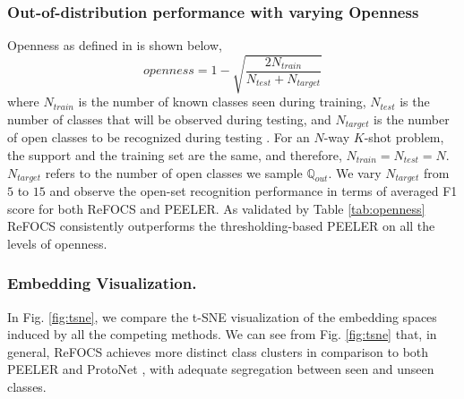 

\subsubsection*{Out-of-distribution performance with varying Openness}
Openness as defined in \cite{sun2020conditional} is shown below,
\begin{equation}
    openness = 1 - \sqrt{\frac{2N_{train}}{N_{test} + N_{target}}}
\end{equation}
where $N_{train}$ is the number of known classes seen during training, $N_{test}$ is the number of classes that will be observed during testing, and $N_{target}$ is the number of open classes to be recognized during testing \cite{sun2020conditional}. For an $N$-way $K$-shot problem, the support and the training set are the same, and therefore, $N_{train} = N_{test} = N$. $N_{target}$ refers to the number of open classes we sample $\mathbb{Q}_{out}$. We vary $N_{target}$ from $5$ to $15$ and observe the open-set recognition performance in terms of averaged F1 score \cite{sun2020conditional} for both ReFOCS and PEELER. As validated by Table \ref{tab:openness} ReFOCS consistently outperforms the thresholding-based PEELER on all the levels of openness.

\subsubsection*{Embedding Visualization.} In Fig. \ref{fig:tsne}, we compare the t-SNE \cite{tsne} visualization of the embedding spaces induced by all the competing methods. We can see from Fig. \ref{fig:tsne} that, in general, ReFOCS achieves more distinct class clusters in comparison to both PEELER \cite{peeler} and ProtoNet \cite{proto_net}, with adequate segregation between seen and unseen classes. 

















